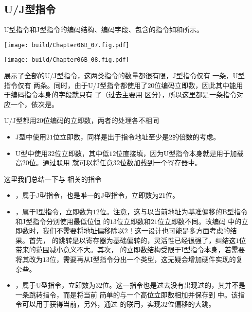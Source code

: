 \subsection{U/J型指令}

U型指令和J型指令的编码结构、编码字段、包含的指令如和所示。
\begin{Figure}[J型指令的编码]
    \texttt{[image: build/Chapter06B\_07.fig.pdf]}
\end{Figure}

\begin{Figure}[U型指令的编码]
    \texttt{[image: build/Chapter06B\_08.fig.pdf]}
\end{Figure}

展示了全部的U/J型指令，这两类指令的数量都很有限，J型指令仅有 一条，U型指令仅有 两条。同时，由于U/J型指令都使用了$20$位编码立即数，因此其中能用于编码指令本身的字段就只有 了（过去主要用 区分），所以这里都是一条指令对应一个，依次是。

U/J型都用$20$位编码的立即数，两者的处理各不相同
\begin{itemize}
    \item J型中使用$21$位立即数，同样是出于指令地址至少是$2$的倍数的考虑。
    \item U型中使用$32$位立即数，其中低$12$位直接填，因为U型指令本身就是用于加载高$20$位。通过联用 就可以将任意$32$位数加载到一个寄存器中。
\end{itemize}

这里我们总结一下与 相关的指令
\begin{itemize}
    \item {}，属于J型指令，也是唯一的J型指令，立即数为$21$位。
    \item {}，属于I型指令，立即数为$12$位。注意，这与以当前地址为基准偏移的B型指令和J型指令分别使用最低位恒 的$13$位立即数和$21$位立即数不同。故编码 中的立即数时，我们不需要将地址偏移除以$2$！这一设计也可能是多方面考虑的结果。首先， 的跳转是以寄存器为基础偏转的，灵活性已经很强了，纠结这$1$位带来的范围减小意义不大。其次， 的立即数结构受限于I型指令本身，若需要将其改为$13$位，需要再从I型指令分出一个类型，这无疑会增加硬件实现的复杂些。
    \item {}，属于U型指令，立即数为$32$位。这一指令也是过去没有出现过的，其并不是一条跳转指令，而是将当前 简单的与一个高位立即数相加并保存到 中。该指令可以用于获得当前，另外，通过 的联用，实现$32$位偏移的大跳。
\end{itemize}

